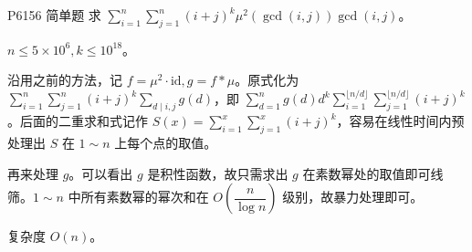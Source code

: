 \documentclass [hyperref={bookmarksdepth=4}, aspectratio=169] {beamer}
\theoremstyle {fy}
\begin{document}
\begin{frame}{P6156 简单题}
求 $\sum\limits_{i=1}^n\sum\limits_{j=1}^n(i+j)^k\mu^2(\gcd(i,j))\gcd(i,j)$。

$n\le 5\times10^6,k\le 10^{18}$。

沿用之前的方法，记 $f=\mu^2\cdot\text{id},g=f*\mu$。原式化为 $\sum\limits_{i=1}^n\sum\limits_{j=1}^n(i+j)^k\sum\limits_{d\mid i,j}g(d)$，即 $\sum\limits_{d=1}^ng(d)d^k\sum\limits_{i=1}^{\lfloor n/d\rfloor}\sum\limits_{j=1}^{\lfloor n/d\rfloor}(i+j)^k$。后面的二重求和式记作 $S(x)=\sum\limits_{i=1}^x\sum\limits_{j=1}^x(i+j)^k$，容易在线性时间内预处理出 $S$ 在 $1\sim n$ 上每个点的取值。

再来处理 $g$。可以看出 $g$ 是积性函数，故只需求出 $g$ 在素数幂处的取值即可线筛。$1\sim n$ 中所有素数幂的幂次和在 $O(\dfrac{n}{\log n})$ 级别，故暴力处理即可。

复杂度 $O(n)$。
\end{frame}
\end{document}
